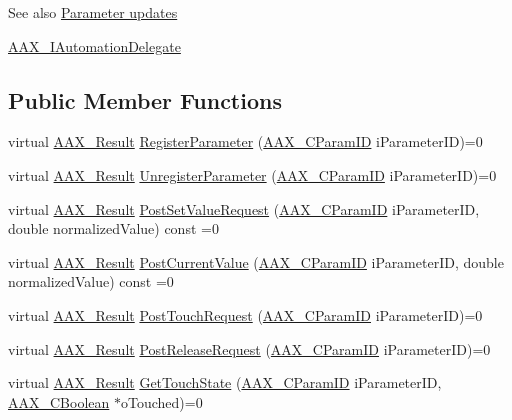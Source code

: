 \begin{DoxySeeAlso}{See also}
\hyperlink{a00350}{Parameter updates} 

\hyperlink{a00086}{A\+A\+X\+\_\+\+I\+Automation\+Delegate} 
\end{DoxySeeAlso}
\subsection*{Public Member Functions}
\begin{DoxyCompactItemize}
\item 
virtual \hyperlink{a00149_a4d8f69a697df7f70c3a8e9b8ee130d2f}{A\+A\+X\+\_\+\+Result} \hyperlink{a00048_a2de166cf16da311514ab40b1871e4435}{Register\+Parameter} (\hyperlink{a00149_a1440c756fe5cb158b78193b2fc1780d1}{A\+A\+X\+\_\+\+C\+Param\+I\+D} i\+Parameter\+I\+D)=0
\item 
virtual \hyperlink{a00149_a4d8f69a697df7f70c3a8e9b8ee130d2f}{A\+A\+X\+\_\+\+Result} \hyperlink{a00048_a5d1ff21e71cd04f717808da4b9f83d62}{Unregister\+Parameter} (\hyperlink{a00149_a1440c756fe5cb158b78193b2fc1780d1}{A\+A\+X\+\_\+\+C\+Param\+I\+D} i\+Parameter\+I\+D)=0
\item 
virtual \hyperlink{a00149_a4d8f69a697df7f70c3a8e9b8ee130d2f}{A\+A\+X\+\_\+\+Result} \hyperlink{a00048_a094075c1a3ddaf01a29a024ce03aabc0}{Post\+Set\+Value\+Request} (\hyperlink{a00149_a1440c756fe5cb158b78193b2fc1780d1}{A\+A\+X\+\_\+\+C\+Param\+I\+D} i\+Parameter\+I\+D, double normalized\+Value) const =0
\item 
virtual \hyperlink{a00149_a4d8f69a697df7f70c3a8e9b8ee130d2f}{A\+A\+X\+\_\+\+Result} \hyperlink{a00048_ac28f4c2e24869a0e28d1a5f358683b12}{Post\+Current\+Value} (\hyperlink{a00149_a1440c756fe5cb158b78193b2fc1780d1}{A\+A\+X\+\_\+\+C\+Param\+I\+D} i\+Parameter\+I\+D, double normalized\+Value) const =0
\item 
virtual \hyperlink{a00149_a4d8f69a697df7f70c3a8e9b8ee130d2f}{A\+A\+X\+\_\+\+Result} \hyperlink{a00048_a6685bdc1e53f26be6e7f6d58a31d06d1}{Post\+Touch\+Request} (\hyperlink{a00149_a1440c756fe5cb158b78193b2fc1780d1}{A\+A\+X\+\_\+\+C\+Param\+I\+D} i\+Parameter\+I\+D)=0
\item 
virtual \hyperlink{a00149_a4d8f69a697df7f70c3a8e9b8ee130d2f}{A\+A\+X\+\_\+\+Result} \hyperlink{a00048_a192c9c9a4af9c29caa763753f59fa59a}{Post\+Release\+Request} (\hyperlink{a00149_a1440c756fe5cb158b78193b2fc1780d1}{A\+A\+X\+\_\+\+C\+Param\+I\+D} i\+Parameter\+I\+D)=0
\item 
virtual \hyperlink{a00149_a4d8f69a697df7f70c3a8e9b8ee130d2f}{A\+A\+X\+\_\+\+Result} \hyperlink{a00048_a6183efcf15bd190cb99c6287be007d52}{Get\+Touch\+State} (\hyperlink{a00149_a1440c756fe5cb158b78193b2fc1780d1}{A\+A\+X\+\_\+\+C\+Param\+I\+D} i\+Parameter\+I\+D, \hyperlink{a00149_aa216506530f1d19a2965931ced2b274b}{A\+A\+X\+\_\+\+C\+Boolean} $\ast$o\+Touched)=0
\end{DoxyCompactItemize}



